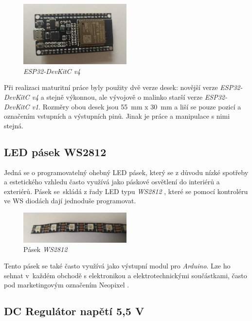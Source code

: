 \begin{figure}[htbp]
	\centering
	\includegraphics[width=0.5\textwidth]{img/02ele/ESPDevKit3.jpg}
	\caption{\textit{ESP32-DevKitC v4}}
\end{figure}

Při realizaci maturitní práce byly použity dvě verze desek: novější verze \textit{ESP32-DevKitC v4} a stejně výkonnou, ale vývojově o malinko starší verze \textit{ESP32-DevKitC v1}. Rozměry obou desek jsou 55~mm x 30~mm a liší se pouze pozicí a označením vstupních a výstupních pinů. Jinak je práce a manipulace s nimi stejná. 

\subsection{LED pásek WS2812}

Jedná se o programovatelný ohebný LED pásek, který se z důvodu nízké spotřeby a estetického vzhledu často využívá jako páskové osvětlení do interiérů a exteriérů. Pásek se~skládá z řady LED typu \textit{WS2812} \cite{WS2812}, které se pomocí kontroléru ve WS diodách dají jednoduše programovat. 

\begin{figure}[htbp]
	\centering
	\includegraphics[width=0.5\textwidth]{img/02ele/OhebnyLedPasek2.jpg}
	\caption{Pásek \textit{WS2812}}
\end{figure}

Tento pásek se také často využívá jako výstupní modul pro \textit{Arduino}. Lze ho sehnat v~každém obchodě s elektronikou a elektrotechnickými součástkami, často pod marketingovým označením Neopixel  \cite{neopixel}. 

\subsection{DC Regulátor napětí 5,5 V}

